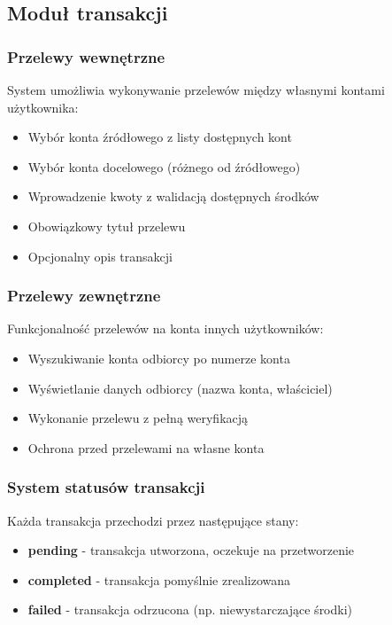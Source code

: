 \documentclass[12pt,a4paper]{article}
\begin{document}
    \subsection{Moduł transakcji}

    \subsubsection{Przelewy wewnętrzne}
    System umożliwia wykonywanie przelewów między własnymi kontami użytkownika:
    \begin{itemize}
        \item Wybór konta źródłowego z listy dostępnych kont
        \item Wybór konta docelowego (różnego od źródłowego)
        \item Wprowadzenie kwoty z walidacją dostępnych środków
        \item Obowiązkowy tytuł przelewu
        \item Opcjonalny opis transakcji
    \end{itemize}

    \subsubsection{Przelewy zewnętrzne}
    Funkcjonalność przelewów na konta innych użytkowników:
    \begin{itemize}
        \item Wyszukiwanie konta odbiorcy po numerze konta
        \item Wyświetlanie danych odbiorcy (nazwa konta, właściciel)
        \item Wykonanie przelewu z pełną weryfikacją
        \item Ochrona przed przelewami na własne konta
    \end{itemize}

    \subsubsection{System statusów transakcji}
    Każda transakcja przechodzi przez następujące stany:
    \begin{itemize}
        \item \textbf{pending} - transakcja utworzona, oczekuje na przetworzenie
        \item \textbf{completed} - transakcja pomyślnie zrealizowana
        \item \textbf{failed} - transakcja odrzucona (np. niewystarczające środki)
    \end{itemize}
\end{document}
